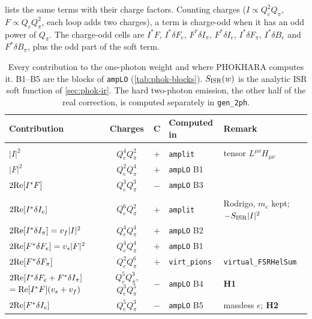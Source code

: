 \documentclass[11pt,a4paper]{article}
\newcommand{\code}[1]{\texttt{#1}}
\newcommand{\phok}{PHOKHARA}
\begin{document}
 lists the same terms with their charge factors. Counting charges
($I\propto Q_e^2Q_\pi$, $F\propto Q_eQ_\pi^2$, each loop adds two charges), a term is charge-odd
when it has an odd power of $Q_\pi$. The charge-odd cells are $I^*F$, $I^*\delta F_e$,
$F^*\delta I_\pi$, $F^*\delta I_e$, $I^*\delta F_\pi$, $I^*\delta B_e$ and $F^*\delta B_\pi$, plus
the odd part of the soft term.

\begin{table}[htbp]
\centering\small
\caption{Every contribution to the one-photon weight and where \phok{} computes it. B1--B5 are the blocks of \code{ampLO} (\cref{tab:phok-blocks}). $S_{\rm ISR}(w)$ is the
  analytic ISR soft function of \cref{sec:phok-ir}. The hard two-photon emission, the other half
  of the real correction, is computed separately in \code{gen\_2ph}.}
\label{tab:phok-map}
\begin{tabularx}{\textwidth}{@{}>{\raggedright\arraybackslash}p{4.6cm}ccl>{\raggedright\arraybackslash}X@{}}
\toprule
Contribution & Charges & C & Computed in & Remark \\
\midrule
\multicolumn{5}{@{}l}{\emph{Tree}}\\
$|I|^2$                          & $Q_e^4Q_\pi^2$ & $+$ & \code{amplit} & tensor $L^{\mu\nu}H_{\mu\nu}$ \\
$|F|^2$                          & $Q_e^2Q_\pi^4$ & $+$ & \code{ampLO} B1 & \\
$2{\rm Re}[I^*F]$                & $Q_e^3Q_\pi^3$ & $-$ & \code{ampLO} B3 & \\
\midrule
\multicolumn{5}{@{}l}{\emph{One loop}}\\
$2{\rm Re}[I^*\delta I_e]$       & $Q_e^6Q_\pi^2$ & $+$ & \code{amplit} & Rodrigo, $m_e$ kept; $-S_{\rm ISR}|I|^2$ \\
$2{\rm Re}[I^*\delta I_\pi]=v_f|I|^2$ & $Q_e^4Q_\pi^4$ & $+$ & \code{ampLO} B2 & \\
$2{\rm Re}[F^*\delta F_e]=v_s|F|^2$   & $Q_e^4Q_\pi^4$ & $+$ & \code{ampLO} B1 & \\
$2{\rm Re}[F^*\delta F_\pi]$     & $Q_e^2Q_\pi^6$ & $+$ & \code{virt\_pions} & \code{virtual\_FSRHelSum} \\
$2{\rm Re}[I^*\delta F_e+F^*\delta I_\pi]$ $={\rm Re}[I^*F](v_s+v_f)$
                                 & $Q_e^5Q_\pi^3$, $Q_e^3Q_\pi^5$ & $-$ & \code{ampLO} B4 & \textbf{H1} \\
$2{\rm Re}[F^*\delta I_e]$       & $Q_e^5Q_\pi^3$ & $-$ & \code{ampLO} B5 & massless $e$; \textbf{H2} \\

\end{tabularx}
\end{table}
\end{document}
